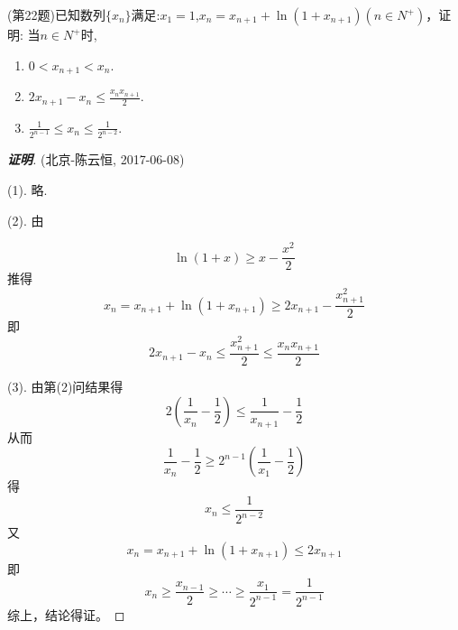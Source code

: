 \documentclass{ctexart}
\begin{document}
\begin{exercise}(第22题)已知数列$\{x_n\}$满足:$x_1=1$,$x_n=x_{n+1}+\ln{(1+x_{n+1})}(n \in N^+)$，证明: 当$n \in N^+$时,
  \begin{enumerate}
  \item $0<x_{n+1}<x_n$.
  \item $2x_{n+1}-x_n \leqslant \frac{x_nx_{n+1}}{2}$.
  \item $\frac{1}{2^{n-1}} \leqslant x_n \leqslant \frac{1}{2^{n-2}}$.
  \end{enumerate}
\end{exercise}

\begin{proof}[\textbf{证明}](北京-陈云恒, 2017-06-08)
  
  (1). 略.

  (2). 由
  
  \[ \ln{(1+x)} \geqslant x-\frac{x^2}{2} \]
  推得
  \[ x_n=x_{n+1}+\ln{(1+x_{n+1})} \geqslant 2x_{n+1}-\frac{x_{n+1}^2}{2} \]
  即
   \[ 2x_{n+1}-x_n \leqslant \frac{x_{n+1}^2}{2} \leqslant \frac{x_nx_{n+1}}{2} \]

   (3). 由第(2)问结果得
   \[ 2 \left( \frac{1}{x_n}-\frac{1}{2} \right) \leqslant \frac{1}{x_{n+1}}- \frac{1}{2} \]
   从而
   \[ \frac{1}{x_n}-\frac{1}{2} \geqslant 2^{n-1} \left( \frac{1}{x_1}-\frac{1}{2} \right) \]
   得
   \[ x_n \leqslant \frac{1}{2^{n-2}} \]
   又
   \[ x_n=x_{n+1}+\ln{(1+x_{n+1})} \leqslant 2x_{n+1} \]
   即
   \[ x_n \geqslant \frac{x_{n-1}}{2} \geqslant \cdots \geqslant \frac{x_1}{2^{n-1}} = \frac{1}{2^{n-1}} \]
   综上，结论得证。
\end{proof}
\end{document}
